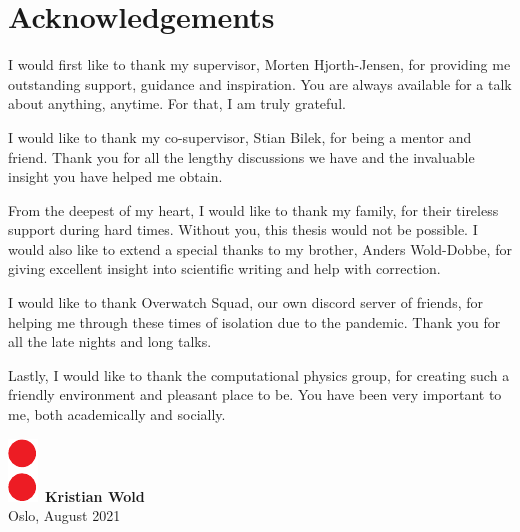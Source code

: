 \chapter*{Acknowledgements}
\thispagestyle{plain}

I would first like to thank my supervisor, Morten Hjorth-Jensen, for providing me outstanding support, guidance and inspiration. You are always available for a talk about anything, anytime. For that, I am truly grateful.

I would like to thank my co-supervisor, Stian Bilek, for being a mentor and friend. Thank you for all the lengthy discussions we have and the invaluable insight you have helped me obtain.

From the deepest of my heart, I would like to thank my family, for their tireless support during hard times. Without you, this thesis would not be possible. I would also like to extend a special thanks to my brother, Anders Wold-Dobbe, for giving excellent insight into scientific writing and help with correction.

I would like to thank Overwatch Squad, our own discord server of friends, for helping me through these times of isolation due to the pandemic. Thank you for all the late nights and long talks.

Lastly, I would like to thank the computational physics group, for creating such a friendly environment and pleasant place to be. You have been very important to me, both academically and socially. 
\\ [8 pt]

\begin{flushright}
\includegraphics[height = 1.5ex]{latex/latex-report/3_Images/Logo/UiO/uio-colon.pdf}\, \textbf{Kristian Wold}
\\
Oslo, August 2021
\end{flushright}
